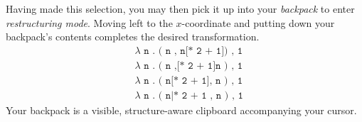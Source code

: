 Having made this selection, you may then pick it up
into your \emph{backpack} to enter \emph{restructuring mode}.
Moving left to the $x$-coordinate and putting down
your backpack's contents completes the desired transformation.
\begin{align*}
  & \texttt{$\lambda$ n . ( n , n[* 2 + 1]) , 1} \\
  & \texttt{$\lambda$ n . ( n ,[* 2 + 1]n ) , 1} \\
  & \texttt{$\lambda$ n . ( n[* 2 + 1], n ) , 1} \\
  & \texttt{$\lambda$ n . ( n|* 2 + 1 , n ) , 1}
\end{align*}
Your backpack is a visible, structure-aware clipboard
accompanying your cursor.



